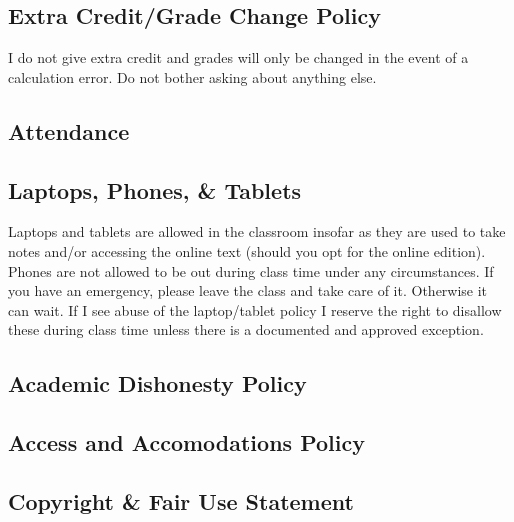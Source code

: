 \documentclass[11pt,]{article}
\begin{document}
\hypertarget{extra-creditgrade-change-policy}{%
\subsection{Extra Credit/Grade Change
Policy}\label{extra-creditgrade-change-policy}}

I do not give extra credit and grades will only be changed in the event
of a calculation error. Do not bother asking about anything else.

\hypertarget{attendance}{%
\subsection{Attendance}\label{attendance}}

\hypertarget{laptops-phones-tablets}{%
\subsection{Laptops, Phones, \& Tablets}\label{laptops-phones-tablets}}

Laptops and tablets are allowed in the classroom insofar as they are
used to take notes and/or accessing the online text (should you opt for
the online edition). Phones are not allowed to be out during class time
under any circumstances. If you have an emergency, please leave the
class and take care of it. Otherwise it can wait. If I see abuse of the
laptop/tablet policy I reserve the right to disallow these during class
time unless there is a documented and approved exception.

\hypertarget{academic-dishonesty-policy}{%
\subsection{Academic Dishonesty
Policy}\label{academic-dishonesty-policy}}

\hypertarget{access-and-accomodations-policy}{%
\subsection{Access and Accomodations
Policy}\label{access-and-accomodations-policy}}

\hypertarget{copyright-fair-use-statement}{%
\subsection{Copyright \& Fair Use
Statement}\label{copyright-fair-use-statement}}
\end{document}
